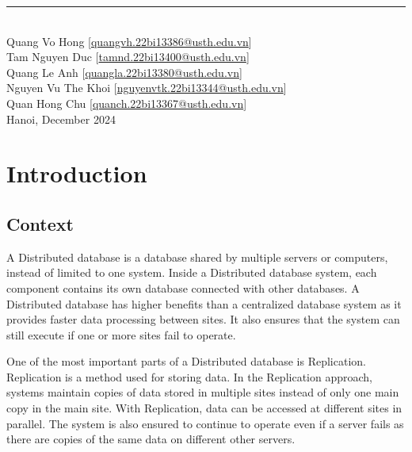 \documentclass[a4paper,12pt]{report}
\begin{document}
\begin{center}
    \vspace{0.5cm}
    \rule{\textwidth}{0.5pt}
    \vspace{1cm}
    \\
    Quang Vo Hong [\href{mailto:quangvh.22bi13386@usth.edu.vn}{quangvh.22bi13386@usth.edu.vn}] \\
    Tam Nguyen Duc [\href{mailto:tamnd.22bi13400@usth.edu.vn}{tamnd.22bi13400@usth.edu.vn}] \\
    Quang Le Anh [\href{mailto:quangla.22bi13380@usth.edu.vn}{quangla.22bi13380@usth.edu.vn}] \\
    Nguyen Vu The Khoi [\href{mailto:nguyenvtk.22bi13344@usth.edu.vn}{nguyenvtk.22bi13344@usth.edu.vn}] \\
    Quan Hong Chu [\href{mailto:quanch.22bi13367@usth.edu.vn}{quanch.22bi13367@usth.edu.vn}] \\
    \vspace{2cm}
    Hanoi, December 2024
\end{center}

\newpage
\tableofcontents

\newpage
\section{\bfseries Introduction}
\fontsize{13}{16}\selectfont

\subsection{Context}
\hspace*{1em}A Distributed database is a database shared by multiple servers or computers, instead of limited to one system. Inside a Distributed database system, each component contains its own database connected with other databases. A Distributed database has higher benefits than a centralized database system as it provides faster data processing between sites. It also ensures that the system can still execute if one or more sites fail to operate.

\hspace*{1em}One of the most important parts of a Distributed database is Replication. Replication is a method used for storing data. In the Replication approach, systems maintain copies of data stored in multiple sites instead of only one main copy in the main site. With Replication, data can be accessed at different sites in parallel. The system is also ensured to continue to operate even if a server fails as there are copies of the same data on different other servers. 
\end{document}
